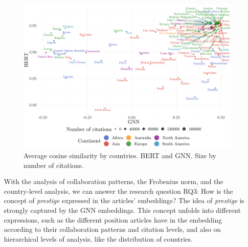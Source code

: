 \documentclass[smallextended]{svjour3}
\begin{document}
	\begin{figure}[!t]
		\centering
		\includegraphics[width=\linewidth]{Fig6}
		\caption{Average cosine similarity by countries. BERT and GNN. Size by number of citations.}
		\label{fig:average_embedding}
	\end{figure}
	
	
	
	With the analysis of collaboration patterns, the Frobenius norm, and the country-level analysis, we can answer the research question {\sf RQ3}: How is the concept of \textit{prestige} expressed in the articles' embeddings?
    The idea of \textit{prestige} is strongly captured by the GNN embeddings. This concept unfolds into different expressions, such as the different position articles have in the embedding according to their collaboration patterns and citation levels, and also on hierarchical levels of analysis, like the distribution of countries.
	

	
	\pagebreak
	
	\printbibliography
	
\end{document}
